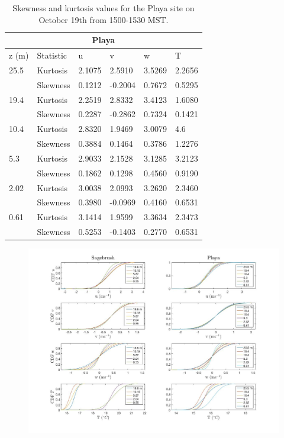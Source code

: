 \documentclass[]{article}
\begin{document}
\begin{table}
\begin{tabular}{ |p{1cm}|p{1.5cm}|p{1cm}|p{1.25cm}|p{1cm}| p{1.25cm}|}
	\hline
	\multicolumn{6}{|c|}{Playa} \\
	\hline\hline
	z (m) & Statistic & u &  v & w & T\\
	\hline
	25.5 & Kurtosis & 2.1075 & 2.5910 & 3.5269 &  2.2656\\
	&Skewness & 0.1212 & -0.2004 & 0.7672 & 0.5295\\
	\hline
	19.4 & Kurtosis & 2.2519 & 2.8332 & 3.4123 &1.6080 \\
	&Skewness & 0.2287 & -0.2862 & 0.7324 & 0.1421\\
	\hline
	10.4 & Kurtosis & 2.8320 & 1.9469 & 3.0079 &4.6 \\
	&Skewness & 0.3884 & 0.1464 & 0.3786 &1.2276\\
	\hline
	5.3 & Kurtosis & 2.9033 & 2.1528  & 3.1285 & 3.2123  \\
	&Skewness & 0.1862 & 0.1298 & 0.4560 & 0.9190\\
	\hline
	2.02 & Kurtosis &\cellcolor{red!25} 3.0038 & 2.0993 & 3.2620  & 2.3460\\
	&Skewness & \cellcolor{blue!25} 0.3980 & -0.0969 & 0.4160 & 0.6531\\
	\hline
	0.61 & Kurtosis & \cellcolor{red!25} 3.1414 & 1.9599 & 3.3634  & 2.3473\\
	&Skewness & \cellcolor{blue!25} 0.5253 & -0.1403 & 0.2770 &0.6531\\
	\hline
\end{tabular}
\label{tab:kurt_playa}
\caption{Skewness and kurtosis values for the Playa site on October 19th from 1500-1530 MST. }
\end{table}
\begin{figure}
\centering
\includegraphics[width=\textwidth]{cdf}
\caption{}
\label{fig:cdf}
\end{figure}
\end{document}
